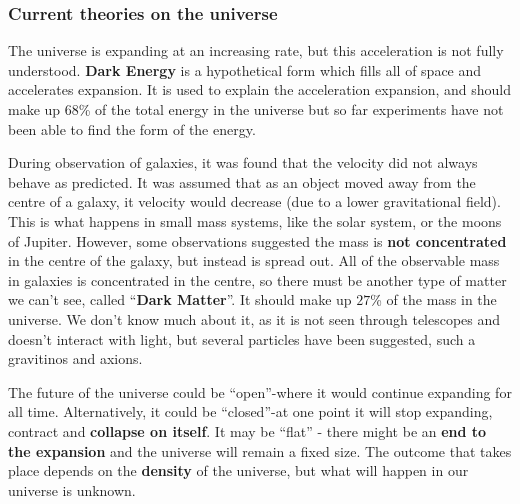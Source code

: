 \subsubsection{Current theories on the universe}

The universe is expanding at an increasing rate, but this acceleration is not fully understood. \textbf{Dark Energy} is a hypothetical form which fills all of space and accelerates expansion. It is used to explain the acceleration expansion, and should make up $68$\% of the total energy in the universe but so far experiments have not been able to find the form of the energy.

During observation of galaxies, it was found that the velocity did not always behave as predicted. It was assumed that as an object moved away from the centre of a galaxy, it velocity would decrease (due to a lower gravitational field). This is what happens in small mass systems, like the solar system, or the moons of Jupiter. However, some observations suggested the mass is \textbf{not concentrated} in the centre of the galaxy, but instead is spread out. All of the observable mass in galaxies is concentrated in the centre, so there must be another type of matter we can't see, called ``\textbf{Dark Matter}''. It should make up $27$\% of the mass in the universe. We don't know much about it, as it is not seen through telescopes and doesn't interact with light, but several particles have been suggested, such a gravitinos and axions. 

The future of the universe could be ``open''-where it would continue expanding for all time. Alternatively, it could be ``closed''-at one point it will stop expanding, contract and \textbf{collapse on itself}. It may be ``flat'' - there might be an \textbf{end to the expansion} and the universe will remain a fixed size. The outcome that takes place depends on the \textbf{density} of the universe, but what will happen in our universe is unknown. 